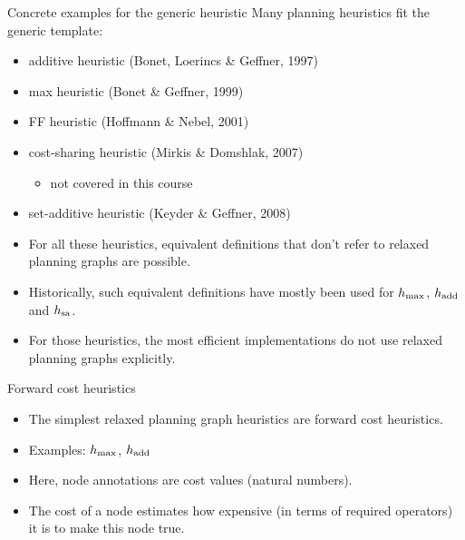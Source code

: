 \documentclass{gkibeamer}
\begin{document}
\begin{frame}{Concrete examples for the generic heuristic}
  Many planning heuristics fit the generic template:
  \begin{itemize}
  \item \alert{additive heuristic \hadd}
    (Bonet, Loerincs \& Geffner, 1997)
  \item \alert{max heuristic \hmax}
    (Bonet \& Geffner, 1999)
  \item \alert{FF heuristic \hff}
    (Hoffmann \& Nebel, 2001)
  \item \alert{cost-sharing heuristic \hcs}
    (Mirkis \& Domshlak, 2007)
    \begin{itemize}
    \item not covered in this course
    \end{itemize}
  \item \alert{set-additive heuristic \hsa}
    (Keyder \& Geffner, 2008)
  \end{itemize}
  \begin{itemize}
  \item For all these heuristics, equivalent definitions that don't
    refer to relaxed planning graphs are possible.
  \item Historically, such equivalent definitions have mostly been
    used for $h_{\text{max}}$, $h_{\text{add}}$ and $h_{\text{sa}}$.
  \item For those heuristics, the most efficient implementations do
    not use relaxed planning graphs explicitly.
  \end{itemize}
\end{frame}

\begin{frame}{Forward cost heuristics}
  \begin{itemize}
  \item The simplest relaxed planning graph heuristics are
    \alert{forward cost heuristics}.
  \item Examples: \alert{$h_{\text{max}}$}, \alert{$h_{\text{add}}$}
  \item Here, node annotations are \alert{cost values} (natural
    numbers).
  \item The cost of a node estimates how expensive (in terms
    of required operators) it is to make this node true.
  \end{itemize}
\end{frame}
\end{document}
